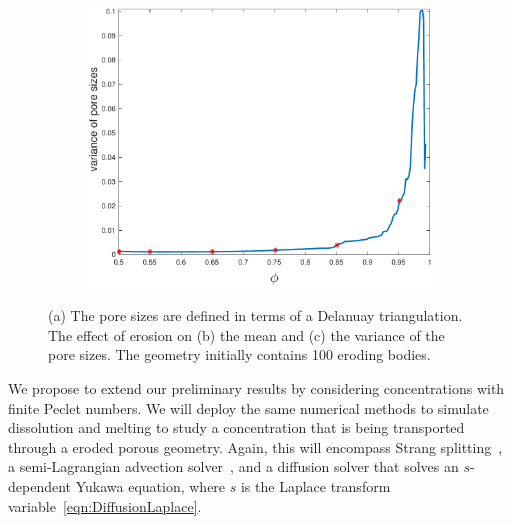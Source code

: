 \documentclass[11pt]{article}
\begin{document}
\begin{figure}[htp]
\begin{subfigure}[b]{0.33\textwidth}
  \includegraphics*[height=0.8\linewidth]{figs/gap_variance}
\caption{}
\end{subfigure}
  \caption{\label{fig:Eroding100gap_mean_var} (a) The pore sizes are
  defined in terms of a Delanuay triangulation. The effect of erosion on
  (b) the mean and (c) the variance of the pore sizes. The geometry
  initially contains 100 eroding bodies.}
\end{figure}

We propose to extend our preliminary results by considering
concentrations with finite Peclet numbers. We will deploy the same
numerical methods to simulate dissolution and melting to study a
concentration that is being transported through a eroded porous
geometry. Again, this will encompass Strang splitting~\cite{str1968}, a
semi-Lagrangian advection solver~\cite{rob1981}, and a diffusion solver
that solves an $s$-dependent Yukawa equation, where $s$ is the Laplace
transform variable~\eqref{eqn:DiffusionLaplace}.
\end{document}
